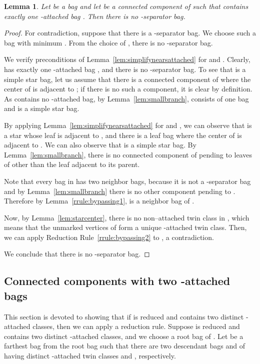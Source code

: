 \documentclass[11pt]{elsarticle}
\newtheorem{lemma}[theorem]{Lemma}
\begin{document}
\begin{lemma}
\label{lem:simplifynearsattached2}
Let  be a bag and let  be a connected component of  such that
 contains exactly one -attached bag .
Then there is no -separator bag.
\end{lemma}
\begin{proof}
For contradiction, suppose that there is a -separator bag. We choose such a bag   with minimum .
From the choice of , there is no -separator bag. 

We verify preconditions of Lemma~\ref{lem:simplifynearsattached} for  and .
Clearly,  has exactly one -attached bag , 
and there is no -separator bag. 
To see that  is a simple star bag, let us assume that there is a connected component  of  where the center of  is adjacent to ; if there is no such a component, it is clear by definition.
As  contains no -attached bag, by Lemma~\ref{lem:smallbranch},  consists of one bag and  is a simple star bag.

By applying Lemma~\ref{lem:simplifynearsattached} for  and , 
we can observe that  is a star whose leaf is adjacent to , and 
there is a leaf bag  where the center of  is adjacent to .
We can also observe that  is a simple star bag.
By Lemma~\ref{lem:smallbranch}, there is no connected component of  pending to leaves of  other than the leaf adjacent to its parent.

Note that every bag  in  has two neighbor bags, because it is not a -separator bag and by Lemma~\ref{lem:smallbranch} there is no other component  pending to .
Therefore  by Lemma~\ref{rrule:bypassing1},  is a neighbor bag of .

Now, by Lemma~\ref{lem:starcenter}, there is no non--attached twin class in , 
which means that the unmarked vertices of  form a unique -attached twin class. 
Then, we can apply Reduction Rule~\ref{rrule:bypassing2} to , a contradiction.

We conclude that there is no -separator bag.
\end{proof}






\subsection{Connected components with two -attached bags}\label{sec:twinclass}




This section is devoted to showing that if  is reduced and contains two distinct -attached classes, then we can apply a reduction rule.
Suppose  is reduced and contains two distinct -attached classes, and we choose a root bag of . 
Let  be a farthest bag from the root bag 
 such that there are two descendant bags  and  of  having distinct -attached twin classes  and , respectively.
\end{document}
